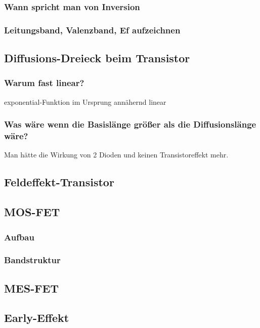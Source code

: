 \documentclass{article}
\begin{document}
    \subsubsection{Wann spricht man von Inversion}
    \subsubsection{Leitungsband, Valenzband, Ef aufzeichnen}

\subsection{Diffusions-Dreieck beim Transistor }\label{k6:diffusionsdreieck}
    \subsubsection{Warum fast linear?} exponential-Funktion im Ursprung ann\"ahernd linear
    \subsubsection{Was w\"are wenn die Basisl\"ange gr\"o{\ss}er als die Diffusionsl\"ange w\"are?} Man h\"atte die Wirkung von 2 Dioden und keinen Transistoreffekt mehr.

\subsection{Feldeffekt-Transistor }\label{k6:fet}

\subsection{MOS-FET }\label{k6:mosfet}
    \subsubsection{Aufbau}
    \subsubsection{Bandstruktur}

\subsection{MES-FET }\label{k6:mesfet}

\subsection{Early-Effekt }\label{k6:early}
\end{document}
